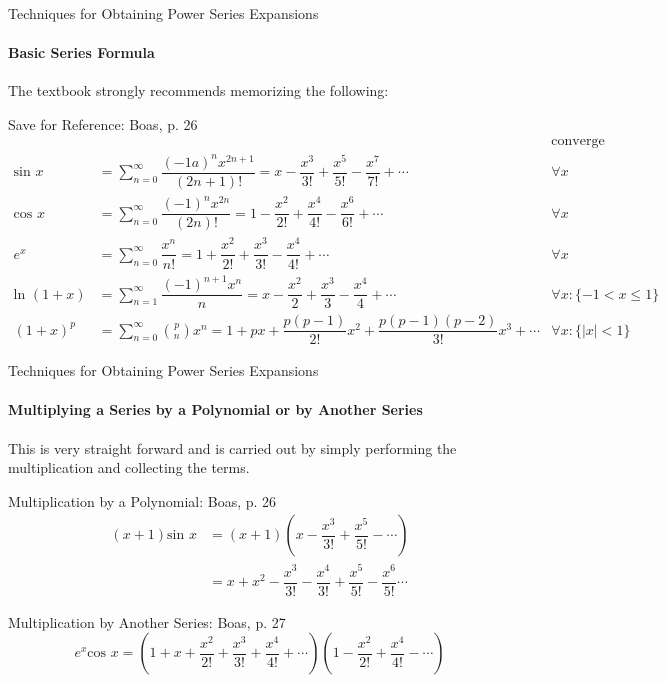 \documentclass{beamer}
\begin{document}
\begin{frame}{Techniques for Obtaining Power Series Expansions}
	\framesubtitle{Basic Series Formula}
	The textbook strongly recommends memorizing the following:
	\begin{alertblock}{Save for Reference: Boas, p. 26}
	{\tiny\begin{align*}
	& & \mbox{converge} \\
	\mbox{sin\ }x &= \sum\limits_{n=0}^\infty\dfrac{(-1a)^nx^{2n+1}}{(2n+1)!} = x-\dfrac{x^3}{3!}+\dfrac{x^5}{5!}-\dfrac{x^7}{7!}+\cdots & \forall x \\
	\mbox{cos\ }x &= \sum\limits_{n=0}^\infty\dfrac{(-1)^nx^{2n}}{(2n)!} =  1-\dfrac{x^2}{2!}+\dfrac{x^4}{4!}-\dfrac{x^6}{6!}+\cdots & \forall x \\
	e^x &= \sum\limits_{n=0}^\infty\dfrac{x^n}{n!} = 1+\dfrac{x^2}{2!}+\dfrac{x^3}{3!}-\dfrac{x^4}{4!}+\cdots & \forall x \\
	\mbox{ln\ }(1+x) &= \sum\limits_{n=1}^\infty\dfrac{(-1)^{n+1}x^n}{n} = x-\dfrac{x^2}{2}+\dfrac{x^3}{3}-\dfrac{x^4}{4}+\cdots & \forall x:\{-1<x\leq 1\} \\
	(1+x)^p &= \sum\limits_{n=0}^\infty {p\choose n}x^n = 1+px+\dfrac{p(p-1)}{2!}x^2+\dfrac{p(p-1)(p-2)}{3!}x^3+\cdots & \forall x:\{ \lvert x\rvert < 1\}
	\end{align*}
	} %
	\end{alertblock}
\end{frame}
  
\begin{frame}{Techniques for Obtaining Power Series Expansions}
    	\framesubtitle{Multiplying a Series by a Polynomial or by Another Series}
    	This is very straight forward and is carried out by simply performing the multiplication and collecting the terms.
    	\begin{exampleblock}{Multiplication by a Polynomial: Boas, p. 26}
    	\begin{align*}
    	(x+1)\mbox{sin\ } x &= (x+1)\left( x-\dfrac{x^3}{3!}+\dfrac{x^5}{5!}-\cdots\right) \\
    	&= x + x^2 - \dfrac{x^3}{3!}-\dfrac{x^4}{3!}+\dfrac{x^5}{5!}-\dfrac{x^6}{5!}\cdots
    	\end{align*}
    	\end{exampleblock}
    	\begin{exampleblock}{Multiplication by Another Series: Boas, p. 27}
	\[e^{x}\mbox{cos\ }x = \left(1+x+\dfrac{x^{2}}{2!}+\dfrac{x^{3}}{3!}+\dfrac{x^{4}}{4!}+\cdots \right)\left(1-\dfrac{x^{2}}{2!}+\dfrac{x^{4}}{4!}-\cdots \right)\]
	\end{exampleblock}
\end{frame}
  
\end{document}
